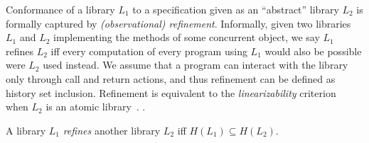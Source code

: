 Conformance of a library $L_1$ to a specification given as an ``abstract'' library $L_2$ 
is formally captured by \emph{(observational) refinement}. Informally, given two libraries
$L_1$ and $L_2$ implementing the methods of some concurrent object, we
say $L_1$ refines $L_2$ if{f} every computation of every program
using $L_1$ would also be possible were $L_2$ used instead. We assume that a program can 
interact with the library only through call and return actions, and thus refinement can be defined
as history set inclusion. Refinement is equivalent to the \emph{linearizability} criterion~\cite{journals/toplas/HerlihyW90} 
when $L_2$ is an atomic library~\cite{journals/tcs/FilipovicORY10,DBLP:conf/popl/BouajjaniEEH15}.
. 

\begin{definition}
A library $L_1$ \emph{refines} another library $L_2$ if{f} $H(L_1) \subseteq H(L_2)$.
\end{definition}


